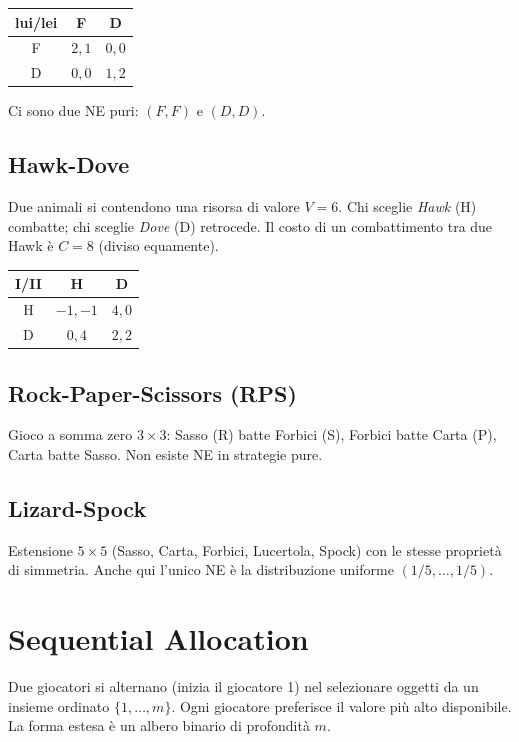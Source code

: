 \documentclass[12pt,a4paper,twoside]{book}
\theoremstyle{plain}
\theoremstyle{definition}
\begin{document}
\begin{center}
\begin{tabular}{c|cc}
lui/lei & F & D \\\hline
F & $2,1$ & $0,0$ \\
D & $0,0$ & $1,2$
\end{tabular}
\end{center}

Ci sono due NE puri: $(F,F)$ e $(D,D)$.

\subsection{Hawk-Dove}

Due animali si contendono una risorsa di valore $V=6$. Chi sceglie \emph{Hawk} (H) combatte; chi sceglie \emph{Dove} (D) retrocede. Il costo di un combattimento tra due Hawk è $C=8$ (diviso equamente).

\begin{center}
\begin{tabular}{c|cc}
I/II & H & D \\\hline
H & $-1,-1$ & $4,0$ \\
D & $0,4$ & $2,2$
\end{tabular}
\end{center}

\subsection{Rock-Paper-Scissors (RPS)}

Gioco a somma zero $3\times 3$: Sasso (R) batte Forbici (S), Forbici batte Carta (P), Carta batte Sasso. Non esiste NE in strategie pure.

\subsection{Lizard-Spock}

Estensione $5\times 5$ (Sasso, Carta, Forbici, Lucertola, Spock) con le stesse proprietà di simmetria. Anche qui l'unico NE è la distribuzione uniforme $(1/5,\dots,1/5)$.

\section{Sequential Allocation}

Due giocatori si alternano (inizia il giocatore 1) nel selezionare oggetti da un insieme ordinato $\{1,\dots,m\}$. Ogni giocatore preferisce il valore più alto disponibile. La forma estesa è un albero binario di profondità $m$.
\end{document}
